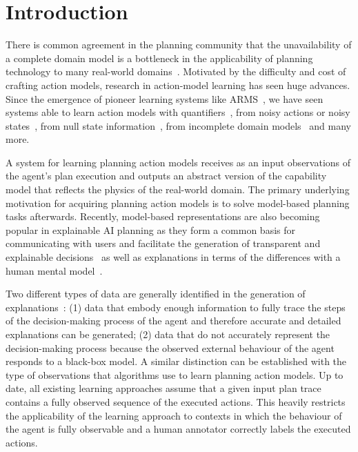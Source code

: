 
\section{Introduction}
\label{sec:introduction}

There is common agreement in the planning community that the unavailability of a complete domain model is a bottleneck in the applicability of planning technology to many real-world domains~\cite{kambhampati:modellite:AAAI2007}. Motivated by the difficulty and cost of crafting action models, research in action-model learning has seen huge advances. Since the emergence of pioneer learning systems like ARMS~\cite{yang2007learning}, we have seen systems able to learn action models with quantifiers~\cite{AmirC08,ZhuoYHL10}, from noisy actions or noisy states~\cite{zhuo2013action,MouraoZPS12}, from null state information~\cite{cresswell2013acquiring}, from incomplete domain models~\cite{ZhuoNK13,ZhuoK17} and many more.

A system for learning planning action models receives as an input observations of the agent's plan execution and outputs an abstract version of the capability model that reflects the physics of the real-world domain. The primary underlying motivation for acquiring planning action models is to solve model-based planning tasks afterwards. Recently, model-based representations are also becoming popular in explainable AI planning as they form a common basis for communicating with users and facilitate the generation of transparent and explainable decisions~\cite{FoxLM17} as well as explanations in terms of the differences with a human mental model~\cite{ChakrabortiSK18}.

Two different types of data are generally identified in the generation of explanations~\cite{Sheh17,Roberts18}: (1) data that embody enough information to fully trace the steps of the decision-making process of the agent and therefore accurate and detailed explanations can be generated; (2) data that do not accurately represent the decision-making process because the observed external behaviour of the agent responds to a black-box model. A similar distinction can be established with the type of observations that algorithms use to learn planning action models. Up to date, all existing learning approaches assume that a given input plan trace contains a fully observed sequence of the executed actions. This heavily restricts the applicability of the learning approach to contexts in which the behaviour of the agent is fully observable and a human annotator correctly labels the executed actions.


